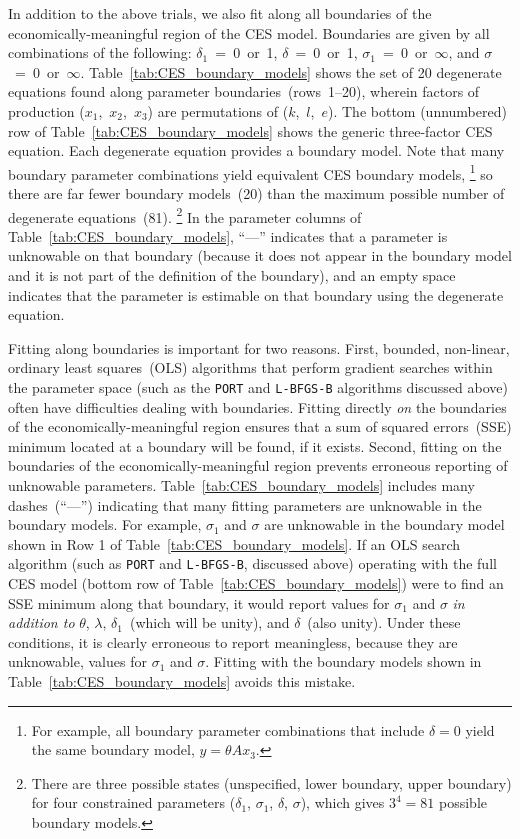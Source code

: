 \documentclass[preprint,10pt,3p]{elsarticle}\usepackage[]{graphicx}\usepackage[]{color}
\newcommand{\sse}{\mbox{SSE}}
\begin{document}
In addition to the above trials,
we also fit along all boundaries of the economically-meaningful region
of the CES model.
Boundaries are given by all combinations of the following:
$\delta_1$~=~0~or~1,
$\delta$~=~0~or~1,
$\sigma_1$~=~0~or~$\infty$, and
$\sigma$~=~0~or~$\infty$.
Table~\ref{tab:CES_boundary_models} shows the set
of 20 degenerate equations found along parameter boundaries~(rows~1--20),
wherein factors of production ($x_1$,~$x_2$,~$x_3$)
are permutations of ($k$,~$l$,~$e$).
The bottom (unnumbered) row of Table~\ref{tab:CES_boundary_models}
shows the generic three-factor CES equation.
Each degenerate equation provides a boundary model.
Note that many boundary parameter combinations
yield equivalent CES boundary models,%
  \footnote{
  For example, all boundary parameter combinations
  that include $\delta = 0$ yield the same boundary model, $y = \theta A x_3$.
  }
so there are far fewer boundary models~(20) than the maximum possible number
of degenerate equations~(81).%
  \footnote{
  There are three possible states (unspecified, lower boundary, upper boundary)
  for four constrained parameters ($\delta_1$, $\sigma_1$, $\delta$, $\sigma$),
  which gives $3^4 = 81$ possible boundary models.
  }
In the parameter columns of Table~\ref{tab:CES_boundary_models},
``---'' indicates that a parameter is unknowable on that boundary
(because it does not appear in the boundary model and
it is not part of the definition of the boundary), and
an empty space indicates that the parameter
is estimable on that boundary using the degenerate equation.

Fitting along boundaries is important for two reasons.
First, bounded, non-linear, ordinary least squares~(OLS) algorithms
that perform gradient searches within the parameter space
(such as the \texttt{PORT} and \texttt{L-BFGS-B} algorithms discussed above)
often have difficulties dealing with boundaries.
Fitting directly \emph{on} the boundaries
of the economically-meaningful region
ensures that a sum of squared errors~(\sse)
minimum located at a boundary will be found, if it exists.
Second, fitting on the boundaries of the economically-meaningful region
prevents erroneous reporting of unknowable parameters.
Table~\ref{tab:CES_boundary_models} includes many dashes~(``---'')
indicating that many fitting parameters are unknowable
in the boundary models.
For example, $\sigma_1$ and $\sigma$ are unknowable in
the boundary model shown in Row 1 of Table~\ref{tab:CES_boundary_models}.
If an OLS search algorithm
(such as \texttt{PORT} and \texttt{L-BFGS-B}, discussed above)
operating with the full CES model (bottom row of Table~\ref{tab:CES_boundary_models})
were to find an \sse{} minimum along that boundary,
it would report values for $\sigma_1$ and $\sigma$
\emph{in addition to} $\theta$, $\lambda$, $\delta_1$~(which will be unity),
and $\delta$~(also unity).
Under these conditions,
it is clearly erroneous to report
meaningless, because they are unknowable,
values for $\sigma_1$ and $\sigma$.
Fitting with the boundary models
shown in Table~\ref{tab:CES_boundary_models}
avoids this mistake.
\end{document}
